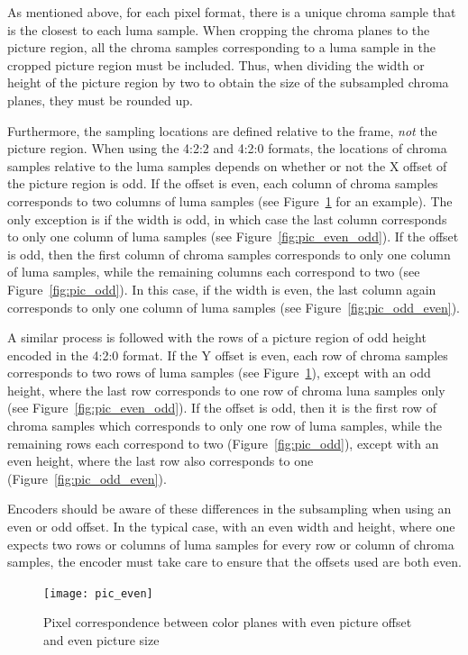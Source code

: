 \documentclass[9pt,letterpaper]{book}
\numberwithin{equation}{chapter}
\numberwithin{figure}{chapter}
\numberwithin{table}{chapter}
\begin{document}
As mentioned above, for each pixel format, there is a unique chroma sample that
 is the closest to each luma sample.
When cropping the chroma planes to the picture region, all the chroma samples
 corresponding to a luma sample in the cropped picture region must be included.
Thus, when dividing the width or height of the picture region by two to obtain
 the size of the subsampled chroma planes, they must be rounded up.

Furthermore, the sampling locations are defined relative to the frame,
 {\em not} the picture region.
When using the 4:2:2 and 4:2:0 formats, the locations of chroma samples
 relative to the luma samples depends on whether or not the X offset of the
 picture region is odd.
If the offset is even, each column of chroma samples corresponds to two columns
 of luma samples (see Figure~\ref{fig:pic_even} for an example).
The only exception is if the width is odd, in which case the last column
 corresponds to only one column of luma samples (see Figure~\ref{fig:pic_even_odd}).
If the offset is odd, then the first column of chroma samples corresponds to
 only one column of luma samples, while the remaining columns each correspond
 to two (see Figure~\ref{fig:pic_odd}).
In this case, if the width is even, the last column again corresponds to only
 one column of luma samples (see Figure~\ref{fig:pic_odd_even}).

A similar process is followed with the rows of a picture region of odd height
 encoded in the 4:2:0 format.
If the Y offset is even, each row of chroma samples corresponds to two rows of
 luma samples (see Figure~\ref{fig:pic_even}), except with an odd height, where
 the last row corresponds to one row of chroma luna samples only (see 
 Figure~\ref{fig:pic_even_odd}).
If the offset is odd, then it is the first row of chroma samples which
 corresponds to only one row of luma samples, while the remaining rows each
 correspond to two (Figure~\ref{fig:pic_odd}), except with an even height, 
 where the last row also corresponds to one (Figure~\ref{fig:pic_odd_even}).

Encoders should be aware of these differences in the subsampling when using an
 even or odd offset.
In the typical case, with an even width and height, where one expects two rows
 or columns of luma samples for every row or column of chroma samples, the
 encoder must take care to ensure that the offsets used are both even.

\begin{figure}[htbp]
\begin{center}
\texttt{[image: pic\_even]}
\end{center}
\caption{Pixel correspondence between color planes with even picture 
 offset and even picture size}
\label{fig:pic_even}
\end{figure}
\end{document}
